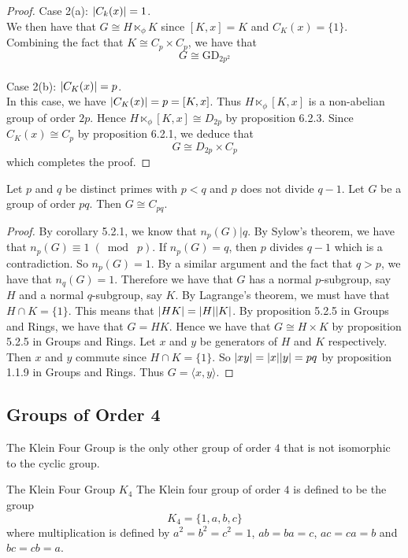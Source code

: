 \documentclass[a4paper]{article}
\begin{document}
\begin{prp}{}{}
\begin{proof}
Case 2(a): $\abs{C_k(x)}=1$. \\
We then have that $G\cong H\ltimes_\phi K$ since $[K,x]=K$ and $C_K(x)=\{1\}$. Combining the fact that $K\cong C_p\times C_p$, we have that $$G\cong\text{GD}_{2p^2}$$~\\

Case 2(b): $\abs{C_K(x)}=p$. \\
In this case, we have $\abs{C_K(x)}=p=[K,x]$. Thus $H\ltimes_\phi[K,x]$ is a non-abelian group of order $2p$. Hence $H\ltimes_\phi[K,x]\cong D_{2p}$ by proposition 6.2.3. Since $C_K(x)\cong C_p$ by proposition 6.2.1, we deduce that $$G\cong D_{2p}\times C_p$$ which completes the proof. 
\end{proof}
\end{prp}

\begin{prp}{}{} Let $p$ and $q$ be distinct primes with $p<q$ and $p$ does not divide $q-1$. Let $G$ be a group of order $pq$. Then $G\cong C_{pq}$. 
\begin{proof}
By corollary 5.2.1, we know that $n_p(G)|q$. By Sylow's theorem, we have that $n_p(G)\equiv1\;(\bmod\;p)$. If $ n_p(G)=q$, then $p$ divides $q-1$ which is a contradiction. So $n_p(G)=1$. By a similar argument and the fact that $q>p$, we have that $n_q(G)=1$. Therefore we have that $G$ has a normal $p$-subgroup, say $H$ and a normal $q$-subgroup, say $K$. By Lagrange's theorem, we must have that $H\cap K=\{1\}$. This means that $\abs{HK}=\abs{H}\abs{K}$. By proposition 5.2.5 in Groups and Rings, we have that $G=HK$. Hence we have that $G\cong H\times K$ by proposition 5.2.5 in Groups and Rings. Let $x$ and $y$ be generators of $H$ and $K$ respectively. Then $x$ and $y$ commute since $H\cap K=\{1\}$. So $\abs{xy}=\abs{x}\abs{y}=pq$ by proposition 1.1.9 in Groups and Rings. Thus $G=\langle x,y\rangle$. 
\end{proof}
\end{prp}

\subsection{Groups of Order 4}
The Klein Four Group is the only other group of order $4$ that is not isomorphic to the cyclic group. 
\begin{defn}{The Klein Four Group $K_4$}{} The Klein four group of order $4$ is defined to be the group $$K_4=\{1,a,b,c\}$$ where multiplication is defined by $a^2=b^2=c^2=1$, $ab=ba=c$, $ac=ca=b$ and $bc=cb=a$. 
\end{defn}
\end{document}
